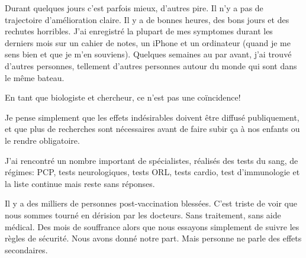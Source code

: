 {Durant quelques jours c'est parfois mieux, d'autres pire. Il n'y a pas de trajectoire d'amélioration claire. Il y a de bonnes heures, des bons jours et des rechutes horribles. J'ai enregistré la plupart de mes symptomes durant les derniers mois sur un cahier de notes, un iPhone et un ordinateur (quand je me sens bien et que je m'en souviens). Quelques semaines au par avant, j'ai trouvé d'autres personnes, tellement d'autres personnes autour du monde qui sont dans le même bateau.

En tant que biologiste et chercheur, ce n'est pas une coïncidence!

Je pense simplement que les effets indésirables doivent être diffusé publiquement, et que plus de recherches sont nécessaires avant de faire subir ça à nos enfants ou le rendre obligatoire.

J'ai rencontré un nombre important de spécialistes, réalisés des tests du sang, de régimes: PCP, tests neurologiques, tests ORL, tests cardio, test d'immunologie et la liste continue mais reste sans réponses.

Il y a des milliers de personnes post-vaccination blessées. C'est triste de voir que nous sommes tourné en dérision par les docteurs. Sans traitement, sans aide médical. Des mois de souffrance alors que nous essayons simplement de suivre les règles de sécurité. Nous avons donné notre part. Mais personne ne parle des effets secondaires.

}
